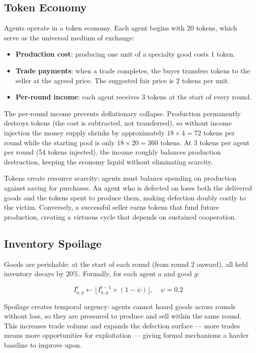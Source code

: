 \documentclass[12pt, a4paper]{article}
\begin{document}
\subsection{Token Economy}

Agents operate in a token economy. Each agent begins with 20 tokens, which serve as the universal medium of exchange:

\begin{itemize}
  \item \textbf{Production cost}: producing one unit of a specialty good costs 1 token.
  \item \textbf{Trade payments}: when a trade completes, the buyer transfers tokens to the seller at the agreed price. The suggested fair price is 2 tokens per unit.
  \item \textbf{Per-round income}: each agent receives 3 tokens at the start of every round.
\end{itemize}

The per-round income prevents deflationary collapse. Production permanently destroys tokens (the cost is subtracted, not transferred), so without income injection the money supply shrinks by approximately $18 \times 4 = 72$ tokens per round while the starting pool is only $18 \times 20 = 360$ tokens. At 3 tokens per agent per round (54 tokens injected), the income roughly balances production destruction, keeping the economy liquid without eliminating scarcity.

Tokens create resource scarcity: agents must balance spending on production against saving for purchases. An agent who is defected on loses both the delivered goods and the tokens spent to produce them, making defection doubly costly to the victim. Conversely, a successful seller earns tokens that fund future production, creating a virtuous cycle that depends on sustained cooperation.

\subsection{Inventory Spoilage}

Goods are perishable: at the start of each round (from round 2 onward), all held inventory decays by 20\%. Formally, for each agent $a$ and good $g$:

\[
I_{a,g}^{t} \leftarrow \lfloor I_{a,g}^{t-1} \times (1 - \psi) \rfloor, \quad \psi = 0.2
\]

Spoilage creates temporal urgency: agents cannot hoard goods across rounds without loss, so they are pressured to produce and sell within the same round. This increases trade volume and expands the defection surface — more trades means more opportunities for exploitation — giving formal mechanisms a harder baseline to improve upon.
\end{document}
